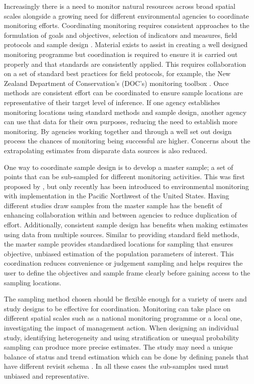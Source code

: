 \documentclass[titlepage]{article}
\begin{document}
Increasingly there is a need to monitor natural resources across broad spatial scales alongside a growing need for different environmental agencies to coordinate monitoring efforts. Coordinating monitoring requires consistent approaches to the formulation of goals and objectives, selection of indicators and measures, field protocols and sample design \citep{fancy2009monitoring, LarsenOlsenStevens2008}. Material exists to assist in creating a well designed monitoring programme \citep{Gitzen2012, Reynolds2016, Vos2000} but coordination is required to ensure it is carried out properly and that standards are consistently applied. This requires collaboration on a set of standard best practices for field protocols, for example, the New Zealand Department of Conservation's (DOC's) monitoring toolbox \citep{DOC}. Once methods are consistent effort can be coordinated to ensure sample locations are representative of their target level of inference. If one agency establishes monitoring locations using standard methods and sample design, another agency can use that data for their own purposes, reducing the need to establish more monitoring. By agencies working together and through a well set out design process the chances of monitoring being successful are higher. Concerns about the extrapolating estimates from disparate data sources is also reduced.

One way to coordinate sample design is to develop a master sample; a set of points that can be sub-sampled for different monitoring activities. This was first proposed by \citep{King1945}, but only recently has been introduced to environmental monitoring \citep{LarsenOlsenStevens2008, theobald2016} with implementation in the Pacific Northwest of the United States. Having different studies draw samples from the master sample has the benefit of enhancing collaboration within and between agencies to reduce duplication of effort. Additionally, consistent sample design has benefits when making estimates using data from multiple sources. Similar to providing standard field methods, the master sample provides standardised locations for sampling that ensures objective, unbiased estimation of the population parameters of interest. This coordination reduces convenience or judgement sampling and helps requires the user to define the objectives and sample frame clearly before gaining access to the sampling locations. 

The sampling method chosen should be flexible enough for a variety of users and study designs to be effective for coordination. Monitoring can take place on different spatial scales such as a national monitoring programme or a local one, investigating the impact of management action. When designing an individual study, identifying heterogeneity and using stratification \citep{Yoccoz2001} or unequal probability sampling \citep{Stevens1997} can produce more precise estimates. The study may need a unique balance of status and trend estimation which can be done by defining panels that have different revisit schema \citep{Skalski1990, Mcdonald2003, StevensOlsen1999}. In all these cases the sub-samples used must unbiased and representative.
\end{document}

